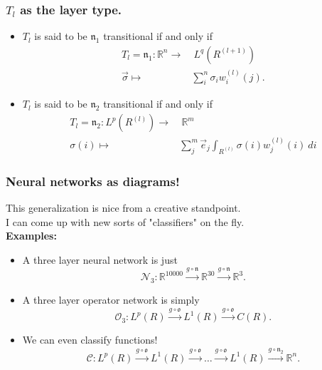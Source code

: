 \documentclass{beamer}
\begin{document}
\begin{frame}
	\frametitle{$T_l$ as the layer type.}
	\begin{definition}
	\begin{itemize}
	  \item $T_l$ is said to be $\mathfrak{n}_1$ transitional if and only if 
    \begin{equation} \label{eq:tldiscrete}
    \begin{aligned} 
      T_l = \mathfrak{n}_1: \mathbb{R}^n \to&\  L^q(R^{(l+1)}) \\
      \vec{\sigma} \mapsto& \sum_i^n \sigma_i w^{(l)}_i(j).
    \end{aligned}
    \end{equation}
  \item $T_l$ is said to be $\mathfrak{n}_2$ transitional if and only if 
    \begin{equation} \label{eq:tldiscrete}
    \begin{aligned} 
      T_l = \mathfrak{n}_2: L^p(R^{(l)}) \to&\ \mathbb{R}^m \\
      \sigma(i) \mapsto& \sum_j^m \vec{e}_j\int_{R^{(l)}} \sigma(i) w^{(l)}_j(i)\ di
    \end{aligned}
    \end{equation}
	\end{itemize}
	\end{definition}
\end{frame}


\begin{frame}
	\frametitle{Neural networks as diagrams!}
	This generalization is nice from a creative standpoint. \\ 
	I can come up with new sorts of "classifiers" on the fly. \\

	\textbf{Examples:}
	\begin{itemize}
		\item A three layer neural network is just
		\begin{equation}
			\mathcal{N}_3: \mathbb{R}^{10000} \xrightarrow{g \circ \mathfrak{n}}\mathbb{R}^{30}  \xrightarrow{g \circ \mathfrak{n}} \mathbb{R}^{3}.
		\end{equation}
		\item A three layer operator network is simply
		\begin{equation}
			\mathcal{O}_3: L^p(R) 	 \xrightarrow{g \circ \mathfrak{o}} L^1(R) \xrightarrow{g \circ \mathfrak{o}} C(R).
		\end{equation}
		\item We can even classify functions!
		\begin{equation}
			\mathcal{C}:  L^p(R) 	 \xrightarrow{g \circ \mathfrak{o}} L^1(R) \xrightarrow{g \circ \mathfrak{o}} \dots \xrightarrow{g \circ \mathfrak{o}} L^1(R)\xrightarrow{g \circ \mathfrak{n}_2}  \mathbb{R}^n.
		\end{equation}
	\end{itemize}
\end{frame}
\end{document}
